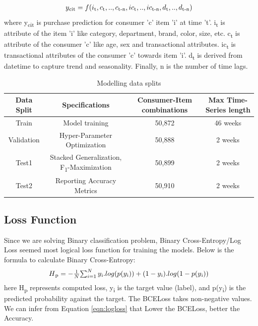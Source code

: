   \begin{equation}
    \begin{array}{l}
      y\textsubscript{cit}  = f(i\textsubscript{t}, c\textsubscript{t},..,c\textsubscript{t-n}, ic\textsubscript{t}
      ,..,ic\textsubscript{t-n}, d\textsubscript{t},..,d\textsubscript{t-n})
    \end{array}
    \label{eqn:fx}
  \end{equation}
where y\textsubscript{cit} is purchase prediction for consumer 'c' item ’i’ at time ’t’. 
i\textsubscript{t} is attribute of the item ’i’ like category, department, brand, color, size, etc. 
c\textsubscript{t} is attribute of the consumer 'c' like age, sex and transactional attributes. 
ic\textsubscript{t} is transactional attributes of the consumer 'c'  towards item 'i'. 
d\textsubscript{t} is derived from datetime to capture trend and seasonality. 
Finally, n is the number of time lags.
\begin{table}[t]
\caption{Modelling data splits}
\vspace{0.1 in}
\centering
\resizebox{3.3in}{!}
{%
\begin{tabular}{|c|c|c|c|}
\hline
{\bf Data Split} & {\bf Specifications} & {\bf Consumer-Item combinations} & {\bf Max Time-Series length} \\  
\hline\hline
Train  		&  Model training &  50,872 &  46 weeks \\ \hline
Validation	  		&  Hyper-Parameter Optimization &  50,888 &  2 weeks \\ \hline
Test1  		&  Stacked Generalization, F\textsubscript{1}-Maximization & 50,899 &  2 weeks\\ \hline
Test2	  		&  Reporting Accuracy Metrics & 50,910 &  2 weeks\\
\hline
\end{tabular}
}
\label{tab:datasplit}
\end{table}
\subsection{Loss Function}
Since we are solving Binary classification problem, Binary Cross-Entropy/Log Loss seemed most logical loss function 
for training the models. Below is the formula to calculate Binary Cross-Entropy:
  \begin{equation}
      \begin{array}{l}
        H\textsubscript{p} = - \frac{1}{N}$$\sum_{i=1}^{N}y\textsubscript{i}.log(p(y\textsubscript{i}))+
        (1- y\textsubscript{i}).log(1-p(y\textsubscript{i}))
      \end{array}
    \label{eqn:logloss}
  \end{equation}
here H\textsubscript{p} represents computed loss, y\textsubscript{i} is the target value (label), and p(y\textsubscript{i}) 
is the predicted probability against the target. The BCELoss takes non-negative values. We can infer 
from Equation \ref{eqn:logloss} that Lower the BCELoss, better the Accuracy.
